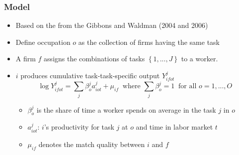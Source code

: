 \documentclass[11pt]{beamer}
\begin{document}
\begin{frame}
	\frametitle{Model}
	\begin{itemize}
		\item Based on the from the Gibbons and Waldman (2004 and 2006)
		\item Define occupation $o$ as the collection of firms having the same task
		\item A firm $f$ assigns the combinations of tasks $\left\lbrace 1,...,J\right\rbrace $ to a worker.
		
%		
		\item $i$ produces cumulative task-task-specific output $Y_{ifot}^j$
		\begin{equation}
			\log{Y_{ifot}^j} = \sum_{j} \beta_{o}^{j} a_{iot}^j + \mu_{if} \;\;\text{where } \sum_{j} \beta_{o}^j = 1 \;\;\text{for all }o=1,...,O
		\end{equation}
		\begin{itemize}
			\item $\beta_{o}^{j} $ is the share of time a worker spends on average in the task $j$ in  $o$
			\vspace{0.8 mm}
			\item $a_{iot}^j$:  $i$'s productivity for task $j$ at  $o$ and time in labor market $t$
			\vspace{0.8 mm}
			\item $\mu_{if}$ denotes the match quality between $i$ and $f$ 
		\end{itemize}
	\end{itemize}
\end{frame}
\end{document}
